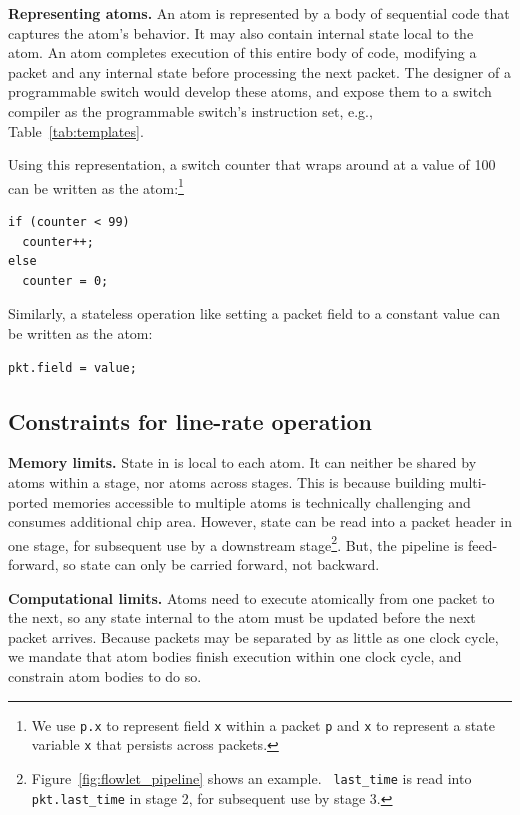 \medskip
\noindent
\textbf{Representing atoms.}
An atom is represented by a body of sequential code that captures the atom's
behavior. It may also contain internal state local to the atom. An atom
completes execution of this entire body of code, modifying a packet and any
internal state before processing the next packet. The designer of a
programmable switch would develop these atoms, and expose them to a switch
compiler as the programmable switch's instruction set, e.g.,
Table~\ref{tab:templates}.

Using this representation, a switch counter that wraps around at a
value of 100 can be written as the atom:\footnote{We use {\tt p.x} to
  represent field {\tt x} within a packet {\tt p} and {\tt x} to
  represent a state variable {\tt x} that persists across packets.}
\begin{lstlisting}[style=customc, numbers=none, frame=none]
if (counter < 99)
  counter++;
else
  counter = 0;
\end{lstlisting}

Similarly, a stateless operation like setting a packet field to a constant
value can be written as the atom:
\begin{lstlisting}[style=customc, numbers=none, frame=none]
  pkt.field = value;
\end{lstlisting}

\subsection{Constraints for line-rate operation}
\label{s:atomConstraints}

\medskip
\noindent
\textbf{Memory limits.} State in \absmachine is local to each atom.  It can
neither be shared by atoms within a stage, nor atoms across stages. This is
because building multi-ported memories accessible to multiple atoms is
technically challenging and consumes additional chip area. However, state can
be read into a packet header in one stage, for subsequent use by a downstream
stage\footnote{Figure~\ref{fig:flowlet_pipeline} shows an example. {\tt
last\_time} is read into {\tt pkt.last\_time} in stage 2, for subsequent use by stage 3.}.  But, the \absmachine pipeline is
feed-forward, so state can only be carried forward, not backward.

\medskip
\noindent
\textbf{Computational limits.} Atoms need to execute atomically from one packet
to the next, so any state internal to the atom must be updated
before the next packet arrives.  Because packets may be separated by as little
as one clock cycle, we mandate that atom bodies finish execution within one
clock cycle, and constrain atom bodies to do so.

